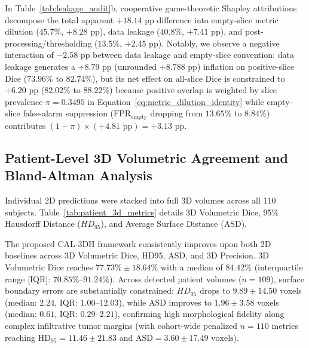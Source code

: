 \documentclass[11pt,a4paper]{article}
\begin{document}
In Table~\ref{tab:leakage_audit}b, cooperative game-theoretic Shapley attributions decompose the total apparent $+18.14\text{ pp}$ difference into empty-slice metric dilution ($45.7\%$, $+8.28\text{ pp}$), data leakage ($40.8\%$, $+7.41\text{ pp}$), and post-processing/thresholding ($13.5\%$, $+2.45\text{ pp}$). Notably, we observe a negative interaction of $-2.58\text{ pp}$ between data leakage and empty-slice convention: data leakage generates a $+8.79\text{ pp}$ (unrounded $+8.788\text{ pp}$) inflation on positive-slice Dice ($73.96\%$ to $82.74\%$), but its net effect on all-slice Dice is constrained to $+6.20\text{ pp}$ ($82.02\%$ to $88.22\%$) because positive overlap is weighted by slice prevalence $\pi = 0.3495$ in Equation~\ref{eq:metric_dilution_identity} while empty-slice false-alarm suppression ($\text{FPR}_{\text{empty}}$ dropping from $13.65\%$ to $8.84\%$) contributes $(1 - \pi) \times (+4.81\text{ pp}) = +3.13\text{ pp}$.

\subsection{Patient-Level 3D Volumetric Agreement and Bland-Altman Analysis}
Individual 2D predictions were stacked into full 3D volumes across all 110 subjects. Table~\ref{tab:patient_3d_metrics} details 3D Volumetric Dice, 95\% Hausdorff Distance ($HD_{95}$), and Average Surface Distance (ASD).

The proposed CAL-3DH framework consistently improves upon both 2D baselines across 3D Volumetric Dice, HD95, ASD, and 3D Precision. 3D Volumetric Dice reaches $77.73\% \pm 18.64\%$ with a median of $84.42\%$ (interquartile range [IQR]: $70.85\%$--$91.24\%$). Across detected patient volumes ($n=109$), surface boundary errors are substantially constrained: $HD_{95}$ drops to $9.89 \pm 14.50$ voxels (median: $2.24$, IQR: $1.00$--$12.03$), while ASD improves to $1.96 \pm 3.58$ voxels (median: $0.61$, IQR: $0.29$--$2.21$), confirming high morphological fidelity along complex infiltrative tumor margins (with cohort-wide penalized $n=110$ metrics reaching $\text{HD}_{95} = 11.46 \pm 21.83$ and $\text{ASD} = 3.60 \pm 17.49\text{ voxels}$).
\end{document}
